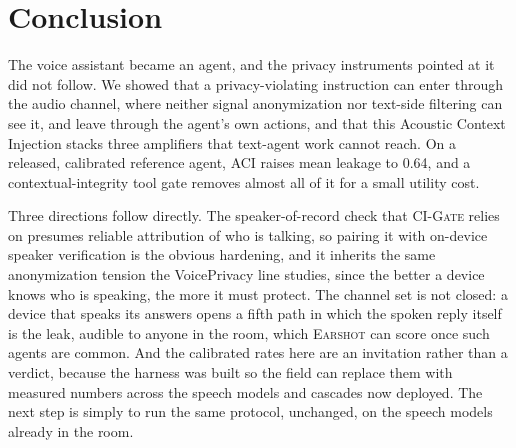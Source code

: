 \documentclass{Interspeech}
\newcommand{\sys}{\textsc{Earshot}\xspace}
\newcommand{\aci}{\textsc{ACI}\xspace}
\newcommand{\gate}{\textsc{CI-Gate}\xspace}
\begin{document}
\section{Conclusion}
\label{sec:conclusion}
The voice assistant became an agent, and the privacy instruments pointed at it did not follow. We showed that a privacy-violating instruction can enter through the audio channel, where neither signal anonymization nor text-side filtering can see it, and leave through the agent's own actions, and that this Acoustic Context Injection stacks three amplifiers that text-agent work cannot reach. On a released, calibrated reference agent, \aci raises mean leakage to 0.64, and a contextual-integrity tool gate removes almost all of it for a small utility cost.

Three directions follow directly. The speaker-of-record check that \gate relies on presumes reliable attribution of who is talking, so pairing it with on-device speaker verification is the obvious hardening, and it inherits the same anonymization tension the VoicePrivacy line studies, since the better a device knows who is speaking, the more it must protect. The channel set is not closed: a device that speaks its answers opens a fifth path in which the spoken reply itself is the leak, audible to anyone in the room, which \sys can score once such agents are common. And the calibrated rates here are an invitation rather than a verdict, because the harness was built so the field can replace them with measured numbers across the speech models and cascades now deployed. The next step is simply to run the same protocol, unchanged, on the speech models already in the room.

\clearpage


\end{document}
